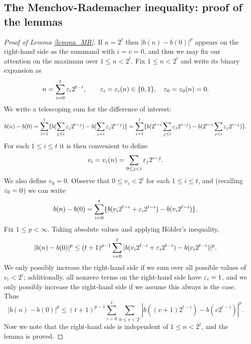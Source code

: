 \documentclass[oneside,11pt]{amsart}
\begin{document}
   \subsection{The Menchov-Rademacher inequality: proof of the lemmas}\label{sec_MR}
   \begin{proof}[Proof of Lemma \ref{lemma_MR}]
 If $n=2^t$ then $|b(n)  - b(0)|^{p}$ appears on the right-hand side as the summand with $i=v=0$, and thus we may fix our attention on the maximum over $1 \leq n< 2^t$. 
 Fix $1 \leq n< 2^t$ and write its binary expansion  as
 \[
 n = \sum_{i=0}^t \varepsilon_i 2^{t-i}, \qquad  \varepsilon_i  = \varepsilon_i(n) \in \{0,1\}, \quad \varepsilon_0 = \varepsilon_0(n)=0.
 \]
 We write a telescoping sum for the difference of interest:
\[
  b(n) - b(0)  =\sum_{i=1}^t \{ b(\sum_{j \leq i} \varepsilon_j 2^{t-j}) - b( \sum_{j<i} \varepsilon_j 2^{t-j}) \}  =\sum_{i=1}^t \{ b(2^{t-i}\sum_{j \leq i} \varepsilon_j 2^{i-j}) - b(2^{t-i} \sum_{j<i} \varepsilon_j 2^{i-j}) \} .\]
   For each $1 \leq i \leq t$ it is then convenient to define
 \[ v_i =v_i(n) = \sum_{0 \leq j < i}\varepsilon_j 2^{i-j}. \]
We also define $v_0=0$. Observe that $0 \leq v_i < 2^i$ for each $1 \leq i \leq t$, and (recalling $\varepsilon_0=0$) we can write
\[
  b(n) - b(0)    =\sum_{i=0}^t \{ b( v_i 2^{t-i} + \varepsilon_i2^{t-i}) - b( v_i 2^{t-i}  ) \}.\]
 Fix $1 \leq p < \infty$. Taking absolute values and applying H\"older's inequality,
  \[ |b(n) - b(0)|^{p} \leq (t+1)^{p-1} \sum_{i=0}^t | b( v_i 2^{t-i} + \varepsilon_i2^{t-i}) - b( v_i 2^{t-i}  ) |^{p}.\]
We only possibly increase the right-hand side  if we  sum  over all possible values of $v_i < 2^i$; additionally, all nonzero terms on the right-hand side have  $\varepsilon_i =1$, and we only possibly increase the right-hand side if we assume this always is the case. 
Thus
 \[ |b(n) - b(0)|^{p} \leq  (t+1)^{p-1} \sum_{i=0}^t \sum_{0 \leq v <2^i} | b( (v+1)  2^{t-i}) - b( v 2^{t-i}  )|^{p} .\]
Now we note that the right-hand side is independent of $1 \leq n < 2^t$, and the lemma is proved.
\end{proof}
\end{document}
